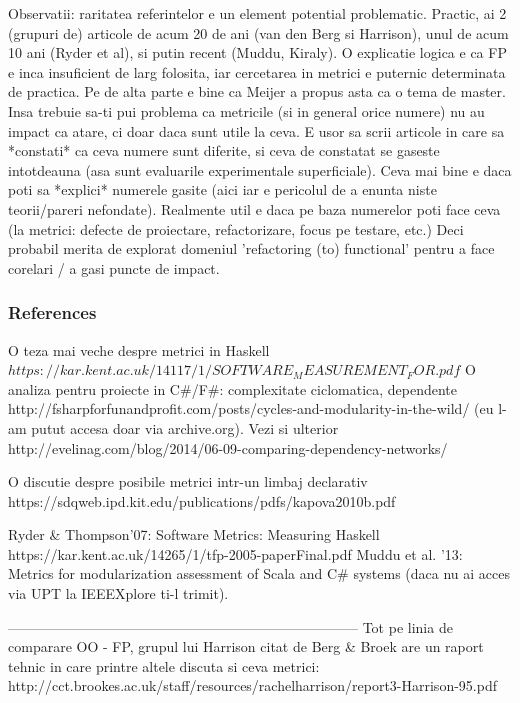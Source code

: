 \documentclass{article}
\begin{document}
Observatii: raritatea referintelor e un element potential problematic.
Practic, ai 2 (grupuri de) articole de acum 20 de ani (van den Berg si
Harrison), unul de acum 10 ani (Ryder et al), si putin recent (Muddu,
Kiraly). O explicatie logica e ca FP e inca insuficient de larg folosita,
iar cercetarea in metrici e puternic determinata de practica.
Pe de alta parte e bine ca Meijer a propus asta ca o tema de master.
Insa trebuie sa-ti pui problema ca metricile (si in general orice numere)
nu au impact ca atare, ci doar daca sunt utile la ceva. E usor sa scrii
articole in care sa *constati* ca ceva numere sunt diferite, si ceva de
constatat se gaseste intotdeauna (asa sunt evaluarile experimentale
superficiale). Ceva mai bine e daca poti sa *explici* numerele gasite
(aici iar e pericolul de a enunta niste teorii/pareri nefondate).
Realmente util e daca pe baza numerelor poti face ceva (la metrici:
defecte de proiectare, refactorizare, focus pe testare, etc.)
Deci probabil merita de explorat domeniul 'refactoring (to) functional'
pentru a face corelari / a gasi puncte de impact.

\subsubsection {References}

O teza mai veche despre metrici in Haskell
        $https://kar.kent.ac.uk/14117/1/SOFTWARE_MEASUREMENT_FOR.pdf$
O analiza pentru proiecte in C\#/F\#: complexitate ciclomatica, dependente
        http://fsharpforfunandprofit.com/posts/cycles-and-modularity-in-the-wild/
(eu l-am putut accesa doar via archive.org). Vezi si ulterior
        http://evelinag.com/blog/2014/06-09-comparing-dependency-networks/

O discutie despre posibile metrici intr-un limbaj declarativ
        https://sdqweb.ipd.kit.edu/publications/pdfs/kapova2010b.pdf

Ryder \& Thompson'07: Software Metrics: Measuring Haskell https://kar.kent.ac.uk/14265/1/tfp-2005-paperFinal.pdf
Muddu et al. '13: Metrics for modularization assessment of Scala and C\# systems
(daca nu ai acces via UPT la IEEEXplore ti-l trimit).


---------------------------------------------------------------------------
Tot pe linia de comparare OO - FP, grupul lui Harrison citat de
Berg \& Broek are un raport tehnic in care printre altele discuta
si ceva metrici:
        http://cct.brookes.ac.uk/staff/resources/rachelharrison/report3-Harrison-95.pdf
\end{document}
